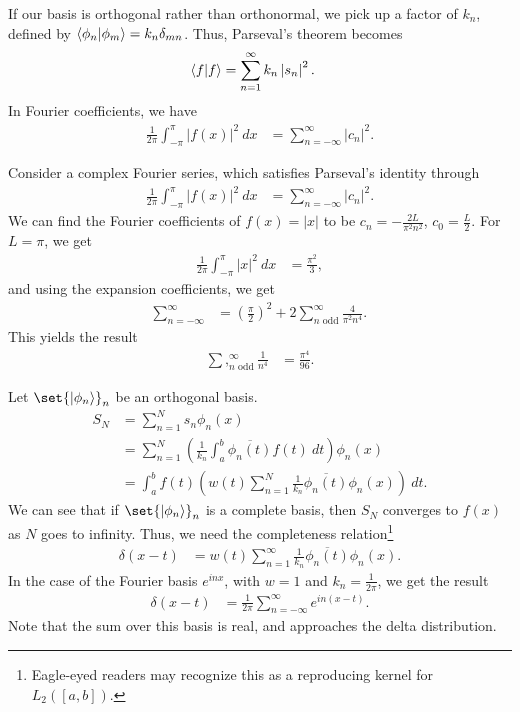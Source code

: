 \documentclass[10pt]{mypackage}
\begin{document}
If our basis is orthogonal rather than orthonormal, we pick up a factor of $k_n$, defined by $\braket{\phi_n}{\phi_m} = k_n\delta_{mn}$. Thus, Parseval's theorem becomes
\begin{align*}
  \braket{f}{f} &= \sum_{n=1}^{\infty}k_n\left\vert s_n \right\vert^2.
\end{align*}
In Fourier coefficients, we have
\begin{align*}
  \frac{1}{2\pi}\int_{-\pi}^{\pi} \left\vert f(x) \right\vert^2\:dx &= \sum_{n=-\infty}^{\infty}\left\vert c_n \right\vert^2.
\end{align*}
\begin{example}
  Consider a complex Fourier series, which satisfies Parseval's identity through
  \begin{align*}
    \frac{1}{2\pi}\int_{-\pi}^{\pi} \left\vert f(x) \right\vert^2\:dx &= \sum_{n=-\infty}^{\infty}\left\vert c_n \right\vert^2.
  \end{align*}
  We can find the Fourier coefficients of $f(x) = \left\vert x \right\vert$ to be $c_n = -\frac{2L}{\pi^2n^2}$, $c_0 = \frac{L}{2}$. For $L = \pi$, we get
  \begin{align*}
    \frac{1}{2\pi}\int_{-\pi}^{\pi} \left\vert x \right\vert^2\:dx &= \frac{\pi^2}{3},
  \end{align*}
  and using the expansion coefficients, we get
  \begin{align*}
    \sum_{n=-\infty}^{\infty} &= \left(\frac{\pi}{2}\right)^2 + 2\sum_{n\text{ odd}}^{\infty} \frac{4}{\pi^2n^4}.
  \end{align*}
  This yields the result
  \begin{align*}
    \sum,_{n\text{ odd}}^{\infty}\frac{1}{n^4} &= \frac{\pi^4}{96}.
  \end{align*}
\end{example}
Let $\set{\ket{\phi_n}}_{n}$ be an orthogonal basis.
\begin{align*}
  S_N &= \sum_{n=1}^{N}s_n\phi_n(x)\\
      &= \sum_{n=1}^{N}\left(\frac{1}{k_n}\int_{a}^{b} \overline{\phi_n(t)}f(t)\:dt\right) \phi_n(x)\\
      &= \int_{a}^{b} f(t)\left(w(t)\sum_{n=1}^{N}\frac{1}{k_n}\overline{\phi_n(t)}\phi_n(x)\right)\:dt.
\end{align*}
We can see that if $\set{\ket{\phi_n}}_{n}$ is a complete basis, then $S_N$ converges to $f(x)$ as $N$ goes to infinity. Thus, we need the completeness relation\footnote{Eagle-eyed readers may recognize this as a reproducing kernel for $L_2\left([a,b]\right)$.}
\begin{align*}
  \delta\left(x-t\right) &= w(t)\sum_{n=1}^{\infty}\frac{1}{k_n}\overline{\phi_n\left(t\right)}\phi_n(x).
\end{align*}
In the case of the Fourier basis $e^{inx}$, with $w = 1$ and $k_n = \frac{1}{2\pi}$, we get the result
\begin{align*}
  \delta\left(x-t\right) &= \frac{1}{2\pi}\sum_{n=-\infty}^{\infty}e^{in\left(x-t\right)}.
\end{align*}
Note that the sum over this basis is real, and approaches the delta distribution.\newline
\end{document}
